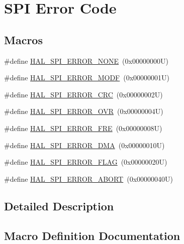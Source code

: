 \hypertarget{group___s_p_i___error___code}{}\section{S\+PI Error Code}
\label{group___s_p_i___error___code}
\subsection*{Macros}
\begin{DoxyCompactItemize}
\item 
\#define \hyperlink{group___s_p_i___error___code_gaac0006cdf5670741f8702e55d4bf4601}{H\+A\+L\+\_\+\+S\+P\+I\+\_\+\+E\+R\+R\+O\+R\+\_\+\+N\+O\+NE}~(0x00000000\+U)
\item 
\#define \hyperlink{group___s_p_i___error___code_ga75f5edd4e2a7a95bc9a994244df52460}{H\+A\+L\+\_\+\+S\+P\+I\+\_\+\+E\+R\+R\+O\+R\+\_\+\+M\+O\+DF}~(0x00000001\+U)
\item 
\#define \hyperlink{group___s_p_i___error___code_gad1163823ec5fa89e4670366565d4ab93}{H\+A\+L\+\_\+\+S\+P\+I\+\_\+\+E\+R\+R\+O\+R\+\_\+\+C\+RC}~(0x00000002\+U)
\item 
\#define \hyperlink{group___s_p_i___error___code_ga9587f998fed196a4f30c38f2da731c0f}{H\+A\+L\+\_\+\+S\+P\+I\+\_\+\+E\+R\+R\+O\+R\+\_\+\+O\+VR}~(0x00000004\+U)
\item 
\#define \hyperlink{group___s_p_i___error___code_gaf03238e57dd0c4d277fef2aa7a083133}{H\+A\+L\+\_\+\+S\+P\+I\+\_\+\+E\+R\+R\+O\+R\+\_\+\+F\+RE}~(0x00000008\+U)
\item 
\#define \hyperlink{group___s_p_i___error___code_gaaf91992131301e3fc7f2ce62fb011f6c}{H\+A\+L\+\_\+\+S\+P\+I\+\_\+\+E\+R\+R\+O\+R\+\_\+\+D\+MA}~(0x00000010\+U)
\item 
\#define \hyperlink{group___s_p_i___error___code_ga777b36b52caf926a384976baf34530a3}{H\+A\+L\+\_\+\+S\+P\+I\+\_\+\+E\+R\+R\+O\+R\+\_\+\+F\+L\+AG}~(0x00000020\+U)
\item 
\#define \hyperlink{group___s_p_i___error___code_gab7fa15838d5ef9316ed8a0ec1c782fb7}{H\+A\+L\+\_\+\+S\+P\+I\+\_\+\+E\+R\+R\+O\+R\+\_\+\+A\+B\+O\+RT}~(0x00000040\+U)
\end{DoxyCompactItemize}


\subsection{Detailed Description}


\subsection{Macro Definition Documentation}
\mbox{\label{group___s_p_i___error___code_gab7fa15838d5ef9316ed8a0ec1c782fb7}} 
